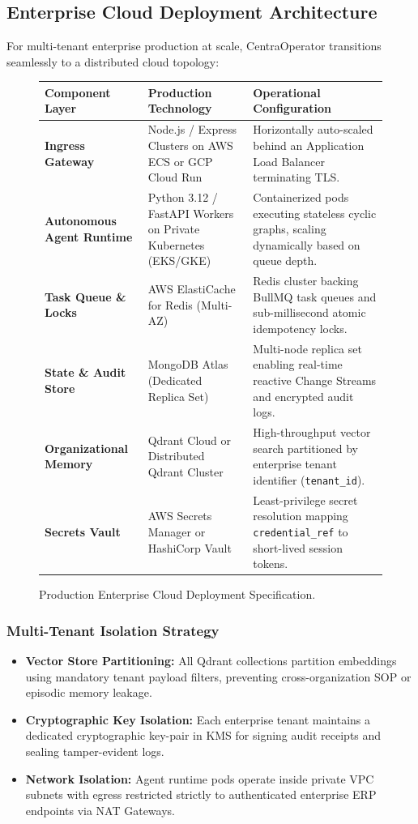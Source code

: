 \subsection{Enterprise Cloud Deployment Architecture}
For multi-tenant enterprise production at scale, CentraOperator transitions seamlessly to a distributed cloud topology:

\begin{figure}[htbp]
  \centering
  \small
  \begin{tabularx}{\textwidth}{p{4.0cm} p{4.5cm} X}
    \toprule
    \textbf{Component Layer} & \textbf{Production Technology} & \textbf{Operational Configuration} \\
    \midrule
    \textbf{Ingress Gateway} & Node.js / Express Clusters on AWS ECS or GCP Cloud Run & Horizontally auto-scaled behind an Application Load Balancer terminating TLS. \\
    \addlinespace
    \textbf{Autonomous Agent Runtime} & Python 3.12 / FastAPI Workers on Private Kubernetes (EKS/GKE) & Containerized pods executing stateless cyclic graphs, scaling dynamically based on queue depth. \\
    \addlinespace
    \textbf{Task Queue \& Locks} & AWS ElastiCache for Redis (Multi-AZ) & Redis cluster backing BullMQ task queues and sub-millisecond atomic idempotency locks. \\
    \addlinespace
    \textbf{State \& Audit Store} & MongoDB Atlas (Dedicated Replica Set) & Multi-node replica set enabling real-time reactive Change Streams and encrypted audit logs. \\
    \addlinespace
    \textbf{Organizational Memory} & Qdrant Cloud or Distributed Qdrant Cluster & High-throughput vector search partitioned by enterprise tenant identifier (\texttt{tenant\_id}). \\
    \addlinespace
    \textbf{Secrets Vault} & AWS Secrets Manager or HashiCorp Vault & Least-privilege secret resolution mapping \texttt{credential\_ref} to short-lived session tokens. \\
    \bottomrule
  \end{tabularx}
  \caption{Production Enterprise Cloud Deployment Specification.}
  \label{tab:cloud_spec}
\end{figure}

\subsubsection{Multi-Tenant Isolation Strategy}
\begin{itemize}[leftmargin=*]
  \item \textbf{Vector Store Partitioning:} All Qdrant collections partition embeddings using mandatory tenant payload filters, preventing cross-organization SOP or episodic memory leakage.
  \item \textbf{Cryptographic Key Isolation:} Each enterprise tenant maintains a dedicated cryptographic key-pair in KMS for signing audit receipts and sealing tamper-evident logs.
  \item \textbf{Network Isolation:} Agent runtime pods operate inside private VPC subnets with egress restricted strictly to authenticated enterprise ERP endpoints via NAT Gateways.
\end{itemize}
